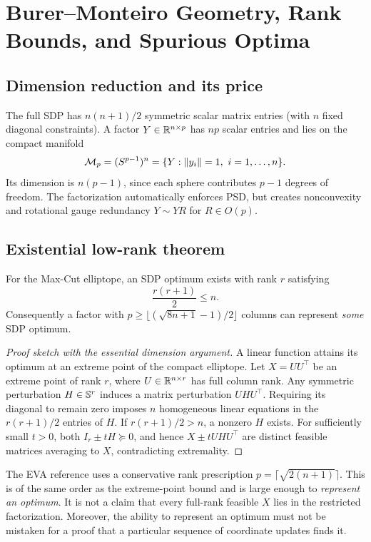 \chapter{Burer--Monteiro Geometry, Rank Bounds, and Spurious Optima}\label{ch:rank}
\section{Dimension reduction and its price}
The full SDP has $n(n+1)/2$ symmetric scalar matrix entries (with $n$ fixed diagonal constraints). A factor $Y\in\mathbb{R}^{n\times p}$ has $np$ scalar entries and lies on the compact manifold
\[
\mathcal M_p=(S^{p-1})^n=\{Y:\norm{y_i}=1,\ i=1,\ldots,n\}.
\]
Its dimension is $n(p-1)$, since each sphere contributes $p-1$ degrees of freedom. The factorization automatically enforces PSD, but creates nonconvexity and rotational gauge redundancy $Y\sim YR$ for $R\in O(p)$.

\section{Existential low-rank theorem}
\begin{theorem}\label{thm:rankbound}
For the Max-Cut elliptope, an SDP optimum exists with rank $r$ satisfying
\[
\frac{r(r+1)}2\le n.
\]
Consequently a factor with $p\ge\lfloor(\sqrt{8n+1}-1)/2\rfloor$ columns can represent \emph{some} SDP optimum.
\end{theorem}
\begin{proof}[Proof sketch with the essential dimension argument]
A linear function attains its optimum at an extreme point of the compact elliptope. Let $X=UU^\top$ be an extreme point of rank $r$, where $U\in\mathbb{R}^{n\times r}$ has full column rank. Any symmetric perturbation $H\in\mathbb{S}^r$ induces a matrix perturbation $UHU^\top$. Requiring its diagonal to remain zero imposes $n$ homogeneous linear equations in the $r(r+1)/2$ entries of $H$. If $r(r+1)/2>n$, a nonzero $H$ exists. For sufficiently small $t>0$, both $I_r\pm tH\succeq0$, and hence $X\pm tUHU^\top$ are distinct feasible matrices averaging to $X$, contradicting extremality.
\end{proof}

\begin{remark}
The EVA reference uses a conservative rank prescription $p=\lceil\sqrt{2(n+1)}\rceil$. This is of the same order as the extreme-point bound and is large enough to \emph{represent an optimum}. It is not a claim that every full-rank feasible $X$ lies in the restricted factorization. Moreover, the ability to represent an optimum must not be mistaken for a proof that a particular sequence of coordinate updates finds it.
\end{remark}

